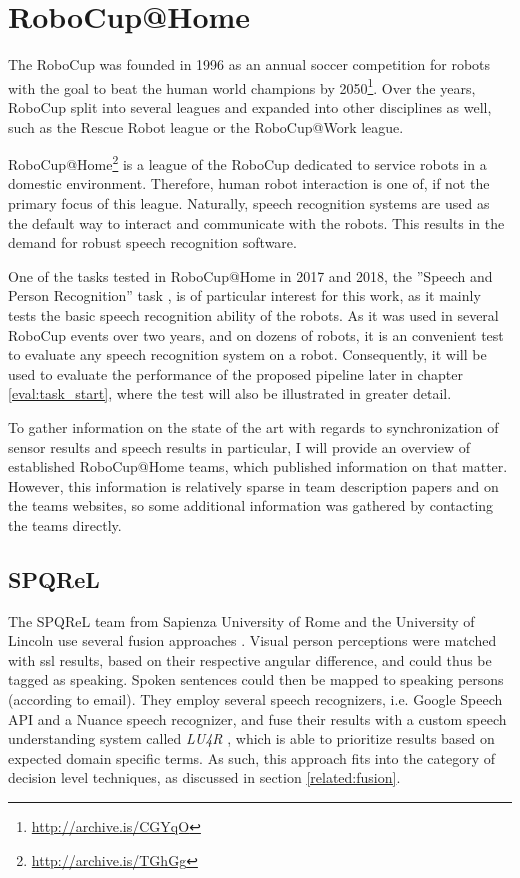 
\section{RoboCup@Home}
\label{related:robocup}
The RoboCup was founded in 1996 as an annual soccer competition for robots with the goal to beat the human world champions by 2050\footnote{\url{http://archive.is/CGYqO}}.
Over the years, RoboCup split into several leagues and expanded into other disciplines as well, such as the Rescue Robot league or the RoboCup@Work league.

RoboCup@Home\footnote{\url{http://archive.is/TGhGg}} is a league of the RoboCup dedicated to service robots in a domestic environment. %
Therefore, human robot interaction is one of, if not the primary focus of this league.
Naturally, speech recognition systems are used as the default way to interact and communicate with the robots.
This results in the demand for robust speech recognition software.%

One of the tasks tested in RoboCup@Home in 2017 and 2018, the ''Speech and Person Recognition'' task \cite{rulebook_2018}, is of particular interest for this work, as it mainly tests the basic speech recognition ability of the robots. 
As it was used in several RoboCup events over two years, and on dozens of robots, it is an convenient test to evaluate any speech recognition system on a robot.
Consequently, it will be used to evaluate the performance of the proposed pipeline later in chapter \ref{eval:task_start}, where the test will also be illustrated in greater detail. 

To gather information on the state of the art with regards to synchronization of sensor results and speech results in particular, I will provide an overview of established RoboCup@Home teams, which published information on that matter.
However, this information is relatively sparse in team description papers and on the teams websites, so some additional information was gathered by contacting the teams directly.

\subsection{SPQReL}
The SPQReL team from Sapienza University of Rome and the University of Lincoln use several fusion approaches \cite{spqrl}.
Visual person perceptions were matched with \gls{ssl} results, based on their respective angular difference, and could thus be tagged as speaking.
Spoken sentences could then be mapped to speaking persons (according to email).
They employ several speech recognizers, i.e. Google Speech API and a Nuance speech recognizer, and fuse their results with a custom speech understanding system called \textit{LU4R} \cite{Bastianelli:2016:DAG:3060832.3061005}, which is able to prioritize results based on expected domain specific terms. 
As such, this approach fits into the category of decision level techniques, as discussed in section \ref{related:fusion}.

